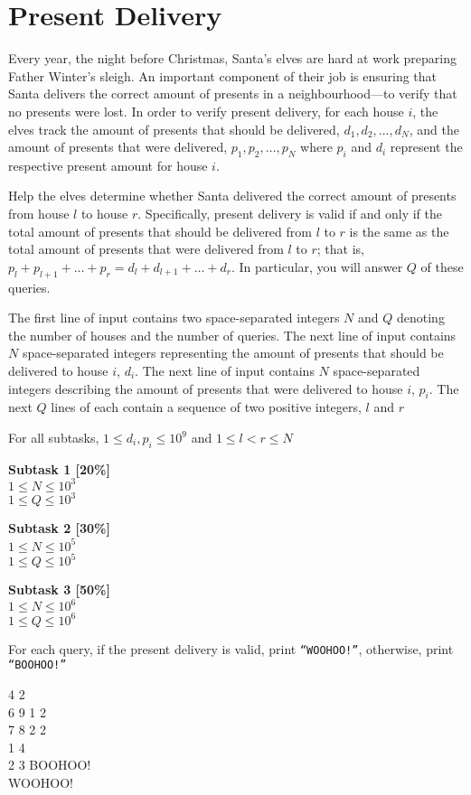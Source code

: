 \section{Present Delivery}
Every year, the night before Christmas, Santa's elves are hard at work preparing Father Winter's sleigh. An important component of their job is ensuring that Santa delivers the correct amount of presents in a neighbourhood—to verify that no presents were lost. In order to verify present delivery, for each house $i$, the elves track the amount of presents that should be delivered, $d_1, d_2, \dots, d_N$, and the amount of presents that were delivered, $p_1, p_2, \dots, p_N$ where $p_i$ and $d_i$ represent the respective present amount for house $i$.

Help the elves determine whether Santa delivered the correct amount of presents from house $l$ to house $r$. Specifically, present delivery is valid if and only if the total amount of presents that should be delivered from $l$ to $r$ is the same as the total amount of presents that were delivered from $l$ to $r$; that is, $p_l + p_{l + 1} + \dots +p _r= d_l + d_{l + 1} + \dots +d_r$. In particular, you will answer $Q$ of these queries.

The first line of input contains two space-separated integers $N$ and $Q$ denoting the number of houses and the number of queries. The next line of input contains $N$ space-separated integers representing the amount of presents that should be delivered to house $i$, $d_i$. The next line of input contains $N$ space-separated integers describing the amount of presents that were delivered to house $i$, $p_i$. The next $Q$ lines of each contain a sequence of two positive integers, $l$ and $r$

\constraints
For all subtasks, $1 \leq d_i, p_i \leq 10^9$ and $1 \leq l < r \leq N$

\textbf{Subtask 1 [20\%]} \\
$1 \leq N \leq 10^3$ \\
$1 \leq Q \leq 10^3$

\textbf{Subtask 2 [30\%]} \\
$1 \leq N \leq 10^5$ \\
$1 \leq Q \leq 10^5$

\textbf{Subtask 3 [50\%]} \\
$1 \leq N \leq 10^6$ \\
$1 \leq Q \leq 10^6$

\outputformat
For each query, if the present delivery is valid, print \texttt{``WOOHOO!''}, otherwise, print \texttt{``BOOHOO!''}
\newpage

\addsample
{
    4 2 \\
    6 9 1 2 \\
    7 8 2 2 \\
    1 4 \\
    2 3
}
{
    BOOHOO! \\
    WOOHOO!
}